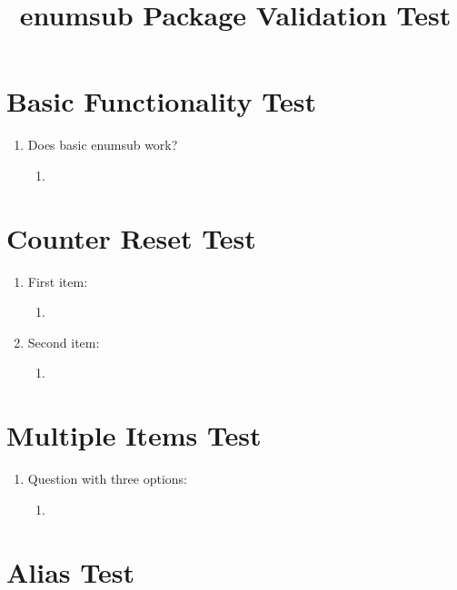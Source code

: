 \documentclass{article}
\begin{document}
\title{enumsub Package Validation Test}
\maketitle

\section{Basic Functionality Test}

\begin{enumerate}
  \item Does basic enumsub work?
  \begin{enumerate}
    \item {} %
  \end{enumerate}
\end{enumerate}

\section{Counter Reset Test}

\begin{enumerate}
  \item First item:
  \begin{enumerate}
    \item {} %
  \end{enumerate}
  \item Second item:
  \begin{enumerate}
    \item {} %
  \end{enumerate}
\end{enumerate}

\section{Multiple Items Test}

\begin{enumerate}
  \item Question with three options:
  \begin{enumerate}
    \item {} %
  \end{enumerate}
\end{enumerate}

\section{Alias Test}
\end{document}
